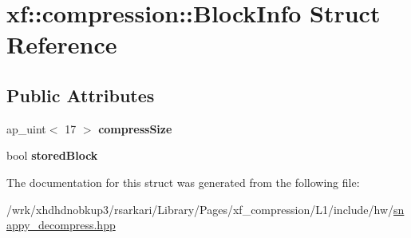 \hypertarget{structxf_1_1compression_1_1BlockInfo}{\section{xf\-:\-:compression\-:\-:Block\-Info Struct Reference}
\label{structxf_1_1compression_1_1BlockInfo}
}
\subsection*{Public Attributes}
\begin{DoxyCompactItemize}
\item 
\hypertarget{structxf_1_1compression_1_1BlockInfo_a5a047270fafd37883e9864301ba875ce}{ap\-\_\-uint$<$ 17 $>$ {\bfseries compress\-Size}}\label{structxf_1_1compression_1_1BlockInfo_a5a047270fafd37883e9864301ba875ce}

\item 
\hypertarget{structxf_1_1compression_1_1BlockInfo_a7441cde438d96163a8dc49e8b0682c92}{bool {\bfseries stored\-Block}}\label{structxf_1_1compression_1_1BlockInfo_a7441cde438d96163a8dc49e8b0682c92}

\end{DoxyCompactItemize}


The documentation for this struct was generated from the following file\-:\begin{DoxyCompactItemize}
\item 
/wrk/xhdhdnobkup3/rsarkari/\-Library/\-Pages/xf\-\_\-compression/\-L1/include/hw/\hyperlink{snappy__decompress_8hpp}{snappy\-\_\-decompress.\-hpp}\end{DoxyCompactItemize}
